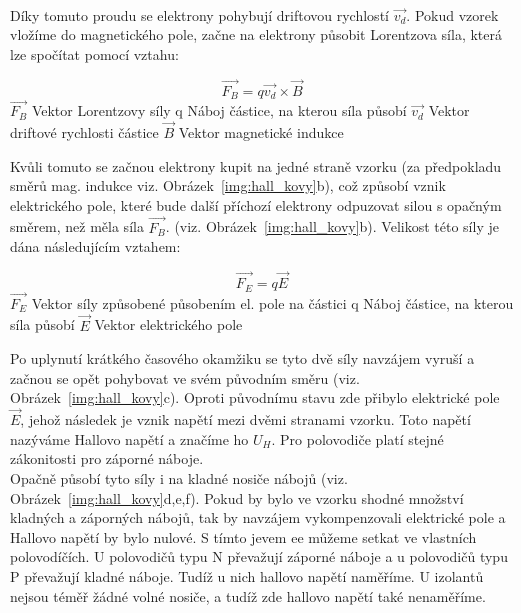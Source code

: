\documentclass{praktikum}
\begin{document}
\paragraph{}
Díky tomuto proudu se elektrony pohybují driftovou rychlostí $\overrightarrow{v_d}$. Pokud vzorek vložíme do magnetického pole, začne na elektrony působit Lorentzova síla, která lze spočítat pomocí vztahu:

\begin{equation}
\label{eqn:theory_fb_lorenz_force}
\overrightarrow{F_B} = q\overrightarrow{v_d}\times \overrightarrow{B}
\end{equation}
$\overrightarrow{F_B}$ \dotfill Vektor Lorentzovy síly \linebreak
q \dotfill Náboj částice, na kterou síla působí \linebreak
$\overrightarrow{v_d}$ \dotfill Vektor driftové rychlosti částice \linebreak
$\overrightarrow{B}$ \dotfill Vektor magnetické indukce \linebreak

Kvůli tomuto se začnou elektrony kupit na jedné straně vzorku (za předpokladu směrů mag. indukce viz. Obrázek~\ref{img:hall_kovy}b), což způsobí vznik elektrického pole, které bude další příchozí elektrony odpuzovat silou s opačným směrem, než měla síla $\overrightarrow{F_B}$. (viz. Obrázek~\ref{img:hall_kovy}b). Velikost této síly je dána následujícím vztahem:

\begin{equation}
\label{eqn:theory_fe_electrical_force}
\overrightarrow{F_E} = q\overrightarrow{E}
\end{equation}
$\overrightarrow{F_E}$ \dotfill Vektor síly způsobené působením el. pole na částici \linebreak
q \dotfill Náboj částice, na kterou síla působí \linebreak
$\overrightarrow{E}$ \dotfill Vektor elektrického pole \linebreak

Po uplynutí krátkého časového okamžiku se tyto dvě síly navzájem vyruší a začnou se opět pohybovat ve svém původním směru (viz. Obrázek~\ref{img:hall_kovy}c). Oproti původnímu stavu zde přibylo elektrické pole $\overrightarrow{E}$, jehož následek je vznik napětí mezi dvěmi stranami vzorku. Toto napětí nazýváme Hallovo napětí a značíme ho $U_H$. Pro polovodiče platí stejné zákonitosti pro záporné náboje. \hfill \\
 \indent Opačně působí tyto síly i na kladné nosiče nábojů (viz. Obrázek~\ref{img:hall_kovy}d,e,f). Pokud by bylo ve vzorku shodné množství kladných a záporných nábojů, tak by navzájem vykompenzovali elektrické pole a Hallovo napětí by bylo nulové. S tímto jevem ee můžeme setkat ve vlastních polovodíčích. U polovodičů typu N převažují záporné náboje a u polovodičů typu P převažují kladné náboje. Tudíž u nich hallovo napětí naměříme. U izolantů nejsou téměř žádné volné nosiče, a tudíž zde hallovo napětí také nenaměříme.
 
\end{document}
